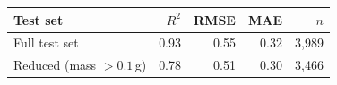 \begin{tabular}{lrrrr}
\toprule
Test set & $R^2$ & RMSE & MAE & $n$ \\
\midrule
Full test set & 0.93 & 0.55 & 0.32 & 3{,}989 \\
Reduced (mass $>0.1$\,g) & 0.78 & 0.51 & 0.30 & 3{,}466 \\
\bottomrule
\end{tabular}
